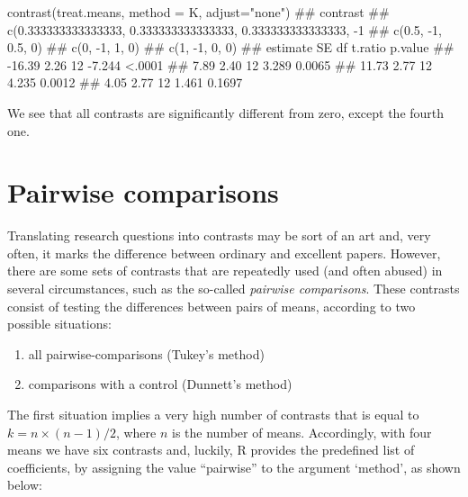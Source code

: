 \documentclass[a4paper,12pt,oneside]{book}
\providecommand{\tightlist}{%
  \setlength{\itemsep}{0pt}\setlength{\parskip}{0pt}}
\newenvironment{Shaded}{\begin{snugshade}}{\end{snugshade}}
\newcommand{\StringTok}[1]{#1}
\newcommand{\DocumentationTok}[1]{#1}
\newcommand{\FunctionTok}[1]{#1}
\newcommand{\AttributeTok}[1]{#1}
\newcommand{\NormalTok}[1]{#1}
\begin{document}
\small

\begin{Shaded}
\begin{Highlighting}[]
\FunctionTok{contrast}\NormalTok{(treat.means, }\AttributeTok{method =}\NormalTok{ K, }\AttributeTok{adjust=}\StringTok{"none"}\NormalTok{)}
\DocumentationTok{\#\#  contrast                                                     }
\DocumentationTok{\#\#  c(0.333333333333333, 0.333333333333333, 0.333333333333333, {-}1}
\DocumentationTok{\#\#  c(0.5, {-}1, 0.5, 0)                                           }
\DocumentationTok{\#\#  c(0, {-}1, 1, 0)                                               }
\DocumentationTok{\#\#  c(1, {-}1, 0, 0)                                               }
\DocumentationTok{\#\#  estimate   SE df t.ratio p.value}
\DocumentationTok{\#\#    {-}16.39 2.26 12  {-}7.244  \textless{}.0001}
\DocumentationTok{\#\#      7.89 2.40 12   3.289  0.0065}
\DocumentationTok{\#\#     11.73 2.77 12   4.235  0.0012}
\DocumentationTok{\#\#      4.05 2.77 12   1.461  0.1697}
\end{Highlighting}
\end{Shaded}

\normalsize

We see that all contrasts are significantly different from zero, except the fourth one.

\hypertarget{pairwise-comparisons}{%
\section{Pairwise comparisons}\label{pairwise-comparisons}}

Translating research questions into contrasts may be sort of an art and, very often, it marks the difference between ordinary and excellent papers. However, there are some sets of contrasts that are repeatedly used (and often abused) in several circumstances, such as the so-called \emph{pairwise comparisons}. These contrasts consist of testing the differences between pairs of means, according to two possible situations:

\begin{enumerate}
\def\labelenumi{\arabic{enumi}.}
\tightlist
\item
  all pairwise-comparisons (Tukey's method)
\item
  comparisons with a control (Dunnett's method)
\end{enumerate}

The first situation implies a very high number of contrasts that is equal to \(k = n \times (n - 1) /2\), where \(n\) is the number of means. Accordingly, with four means we have six contrasts and, luckily, R provides the predefined list of coefficients, by assigning the value ``pairwise'' to the argument `method', as shown below:
\end{document}
